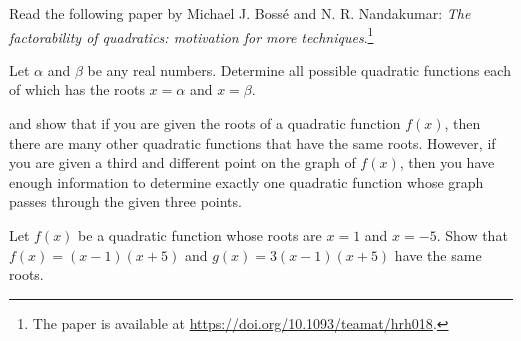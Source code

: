 \documentclass[a4paper,oneside,12pt]{article}
\begin{document}
\begin{problem}
\item Read the following paper by Michael J. Boss\'e and
  N. R. Nandakumar: \emph{The factorability of quadratics: motivation
    for more techniques}.\footnote{
    The paper is available at
    \url{https://doi.org/10.1093/teamat/hrh018}.
  }

\item\label{prob:quadroots:given_roots_all_possible_quadratics}
  Let $\alpha$ and $\beta$ be any real numbers.  Determine all
  possible quadratic functions each of which has the roots
  $x = \alpha$ and $x = \beta$.

\item{} and
   show
  that if you are given the roots of a quadratic function $f(x)$, then
  there are many other quadratic functions that have the same roots.
  However, if you are given a third and different point on the graph
  of $f(x)$, then you have enough information to determine exactly one
  quadratic function whose graph passes through the given three
  points.
  \begin{packedenum}
  \item\label{subprob:quadroots:given_roots_x1_x5}
    Let $f(x)$ be a quadratic function whose roots are $x = 1$ and
    $x = -5$.  Show that $f(x) = (x - 1) (x + 5)$ and
    $g(x) = 3(x - 1) (x + 5)$ have the same roots.


\end{packedenum}
\end{problem}
\end{document}
